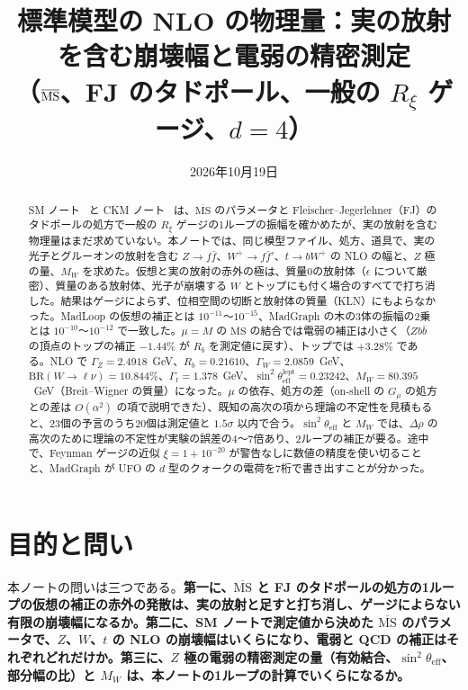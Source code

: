 \documentclass[a4paper,10pt]{ltjsarticle}
\title{標準模型の NLO の物理量：実の放射を含む崩壊幅と電弱の精密測定\\（$\MSbar$、FJ のタドポール、一般の $R_\xi$ ゲージ、$d=4$）}
\author{}
\date{2026年10月19日}
\newcommand{\MSbar}{\overline{\mathrm{MS}}}
\begin{document}
\maketitle

\begin{abstract}
SM ノート~\cite{smnote} と CKM ノート~\cite{ckmnote} は、$\MSbar$ のパラメータと Fleischer--Jegerlehner（FJ）のタドポールの処方で一般の $R_\xi$ ゲージの1ループの振幅を確かめたが、実の放射を含む物理量はまだ求めていない。本ノートでは、同じ模型ファイル、処方、道具で、実の光子とグルーオンの放射を含む $Z\to f\bar f$、$W^+\to f\bar f'$、$t\to bW^+$ の NLO の幅と、$Z$ 極の量、$M_W$ を求めた。仮想と実の放射の赤外の極は、質量0の放射体（$\epsilon$ について厳密）、質量のある放射体、光子が崩壊する $W$ とトップにも付く場合のすべてで打ち消した。結果はゲージによらず、位相空間の切断と放射体の質量（KLN）にもよらなかった。MadLoop の仮想の補正とは $10^{-11}$〜$10^{-15}$、MadGraph の木の3体の振幅の2乗とは $10^{-10}$〜$10^{-12}$ で一致した。$\mu=M$ の $\MSbar$ の結合では電弱の補正は小さく（$Zb\bar b$ の頂点のトップの補正 $-1.44\%$ が $R_b$ を測定値に戻す）、トップでは $+3.28\%$ である。NLO で $\Gamma_Z=2.4918$~GeV、$R_b=0.21610$、$\Gamma_W=2.0859$~GeV、$\mathrm{BR}(W\to\ell\nu)=10.844\%$、$\Gamma_t=1.378$~GeV、$\sin^2\theta^{\mathrm{lept}}_{\mathrm{eff}}=0.23242$、$M_W=80.395$~GeV（Breit--Wigner の質量）になった。$\mu$ の依存、処方の差（on-shell の $G_\mu$ の処方との差は $O(\alpha^2)$ の項で説明できた）、既知の高次の項から理論の不定性を見積もると、23個の予言のうち20個は測定値と $1.5\sigma$ 以内で合う。$\sin^2\theta_{\mathrm{eff}}$ と $M_W$ では、$\Delta\rho$ の高次のために理論の不定性が実験の誤差の4〜7倍あり、2ループの補正が要る。途中で、Feynman ゲージの近似 $\xi=1+10^{-20}$ が警告なしに数値の精度を使い切ることと、MadGraph が UFO の $d$ 型のクォークの電荷を7桁で書き出すことが分かった。
\end{abstract}

\tableofcontents

\section{目的と問い}\label{sec:intro}

本ノートの問いは三つである。\textbf{第一に、$\MSbar$ と FJ のタドポールの処方の1ループの仮想の補正の赤外の発散は、実の放射と足すと打ち消し、ゲージによらない有限の崩壊幅になるか。第二に、SM ノートで測定値から決めた $\MSbar$ のパラメータで、$Z$、$W$、$t$ の NLO の崩壊幅はいくらになり、電弱と QCD の補正はそれぞれどれだけか。第三に、$Z$ 極の電弱の精密測定の量（有効結合、$\sin^2\theta_{\mathrm{eff}}$、部分幅の比）と $M_W$ は、本ノートの1ループの計算でいくらになるか。}
\end{document}
